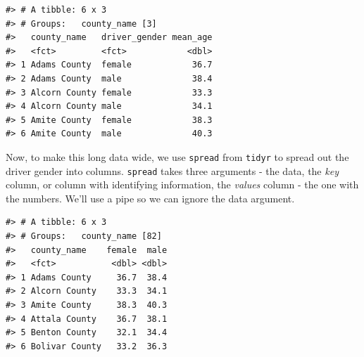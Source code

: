\documentclass[]{book}
\newenvironment{Shaded}{\begin{snugshade}}{\end{snugshade}}
\newcommand{\DataTypeTok}[1]{\textcolor[rgb]{0.13,0.29,0.53}{#1}}
\newcommand{\KeywordTok}[1]{\textcolor[rgb]{0.13,0.29,0.53}{\textbf{#1}}}
\newcommand{\NormalTok}[1]{#1}
\newcommand{\OperatorTok}[1]{\textcolor[rgb]{0.81,0.36,0.00}{\textbf{#1}}}
\newcommand{\OtherTok}[1]{\textcolor[rgb]{0.56,0.35,0.01}{#1}}
\newcommand{\StringTok}[1]{\textcolor[rgb]{0.31,0.60,0.02}{#1}}
\begin{document}
\begin{Shaded}
\end{Shaded}

\begin{verbatim}
#> # A tibble: 6 x 3
#> # Groups:   county_name [3]
#>   county_name   driver_gender mean_age
#>   <fct>         <fct>            <dbl>
#> 1 Adams County  female            36.7
#> 2 Adams County  male              38.4
#> 3 Alcorn County female            33.3
#> 4 Alcorn County male              34.1
#> 5 Amite County  female            38.3
#> 6 Amite County  male              40.3
\end{verbatim}

Now, to make this long data wide, we use \texttt{spread} from \texttt{tidyr} to spread out the
driver gender into columns. \texttt{spread} takes three arguments - the data, the
\emph{key} column, or column with identifying information, the \emph{values} column - the
one with the numbers. We'll use a pipe so we can ignore the data argument.

\begin{Shaded}
\end{Shaded}

\begin{verbatim}
#> # A tibble: 6 x 3
#> # Groups:   county_name [82]
#>   county_name    female  male
#>   <fct>           <dbl> <dbl>
#> 1 Adams County     36.7  38.4
#> 2 Alcorn County    33.3  34.1
#> 3 Amite County     38.3  40.3
#> 4 Attala County    36.7  38.1
#> 5 Benton County    32.1  34.4
#> 6 Bolivar County   33.2  36.3
\end{verbatim}
\end{document}
